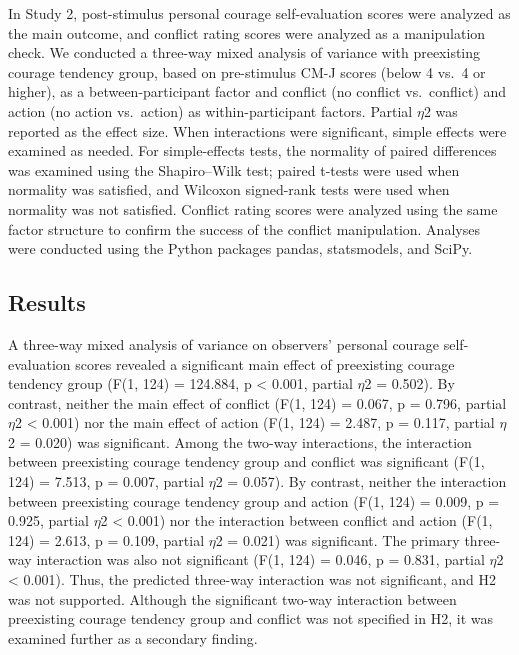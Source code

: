 \documentclass[utf8]{FrontiersinHarvard}
\begin{document}
In Study 2, post-stimulus personal courage self-evaluation scores were analyzed as the main outcome, and conflict rating scores were analyzed as a manipulation check. We conducted a three-way mixed analysis of variance with preexisting courage tendency group, based on pre-stimulus CM-J scores (below 4 vs.~4 or higher), as a between-participant factor and conflict (no conflict vs.~conflict) and action (no action vs.~action) as within-participant factors. Partial $\eta$2 was reported as the effect size. When interactions were significant, simple effects were examined as needed. For simple-effects tests, the normality of paired differences was examined using the Shapiro--Wilk test; paired t-tests were used when normality was satisfied, and Wilcoxon signed-rank tests were used when normality was not satisfied. Conflict rating scores were analyzed using the same factor structure to confirm the success of the conflict manipulation. Analyses were conducted using the Python packages pandas, statsmodels, and SciPy.

\subsection{Results}\label{results-1}

A three-way mixed analysis of variance on observers' personal courage self-evaluation scores revealed a significant main effect of preexisting courage tendency group (F(1, 124) = 124.884, p \textless{} 0.001, partial $\eta$2 = 0.502). By contrast, neither the main effect of conflict (F(1, 124) = 0.067, p = 0.796, partial $\eta$2 \textless{} 0.001) nor the main effect of action (F(1, 124) = 2.487, p = 0.117, partial $\eta$2 = 0.020) was significant. Among the two-way interactions, the interaction between preexisting courage tendency group and conflict was significant (F(1, 124) = 7.513, p = 0.007, partial $\eta$2 = 0.057). By contrast, neither the interaction between preexisting courage tendency group and action (F(1, 124) = 0.009, p = 0.925, partial $\eta$2 \textless{} 0.001) nor the interaction between conflict and action (F(1, 124) = 2.613, p = 0.109, partial $\eta$2 = 0.021) was significant. The primary three-way interaction was also not significant (F(1, 124) = 0.046, p = 0.831, partial $\eta$2 \textless{} 0.001). Thus, the predicted three-way interaction was not significant, and H2 was not supported. Although the significant two-way interaction between preexisting courage tendency group and conflict was not specified in H2, it was examined further as a secondary finding.
\end{document}
